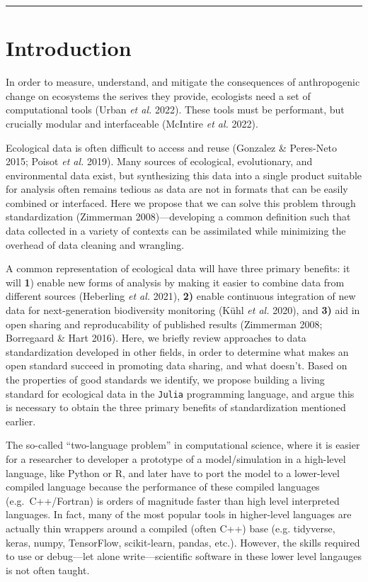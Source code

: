 \documentclass[11pt]{article}
\begin{document}
\begin{center}\rule{0.5\linewidth}{0.5pt}\end{center}

\hypertarget{introduction}{%
\section{Introduction}\label{introduction}}

In order to measure, understand, and mitigate the consequences of
anthropogenic change on ecosystems the serives they provide, ecologists
need a set of computational tools (Urban \emph{et al.} 2022). These
tools must be performant, but crucially modular and interfaceable
(McIntire \emph{et al.} 2022).

Ecological data is often difficult to access and reuse (Gonzalez \&
Peres-Neto 2015; Poisot \emph{et al.} 2019). Many sources of ecological,
evolutionary, and environmental data exist, but synthesizing this data
into a single product suitable for analysis often remains tedious as
data are not in formats that can be easily combined or interfaced. Here
we propose that we can solve this problem through standardization
(Zimmerman 2008)---developing a common definition such that data
collected in a variety of contexts can be assimilated while minimizing
the overhead of data cleaning and wrangling.

A common representation of ecological data will have three primary
benefits: it will \textbf{1}) enable new forms of analysis by making it
easier to combine data from different sources (Heberling \emph{et al.}
2021), \textbf{2)} enable continuous integration of new data for
next-generation biodiversity monitoring (Kühl \emph{et al.} 2020), and
\textbf{3)} aid in open sharing and reproducability of published results
(Zimmerman 2008; Borregaard \& Hart 2016). Here, we briefly review
approaches to data standardization developed in other fields, in order
to determine what makes an open standard succeed in promoting data
sharing, and what doesn't. Based on the properties of good standards we
identify, we propose building a living standard for ecological data in
the \texttt{Julia} programming language, and argue this is necessary to
obtain the three primary benefits of standardization mentioned earlier.

The so-called ``two-language problem'' in computational science, where
it is easier for a researcher to developer a prototype of a
model/simulation in a high-level language, like Python or R, and later
have to port the model to a lower-level compiled language because the
performance of these compiled languages (e.g.~C++/Fortran) is orders of
magnitude faster than high level interpreted languages. In fact, many of
the most popular tools in higher-level languages are actually thin
wrappers around a compiled (often C++) base (e.g. tidyverse, keras,
numpy, TensorFlow, scikit-learn, pandas, etc.). However, the skills
required to use or debug---let alone write---scientific software in
these lower level langauges is not often taught.
\end{document}
